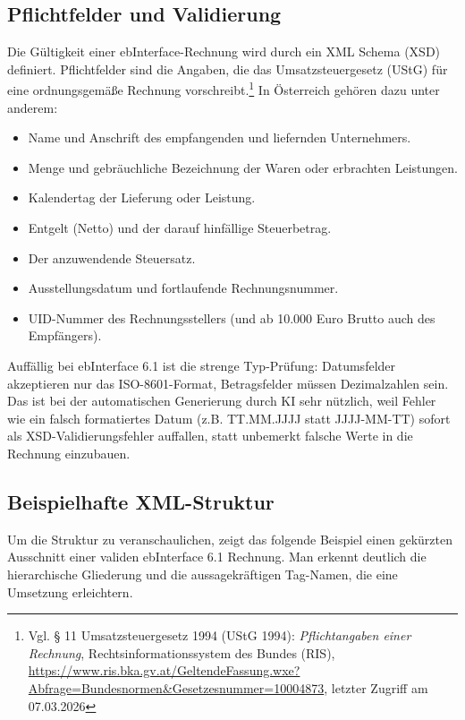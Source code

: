 \subsection{Pflichtfelder und Validierung}
Die Gültigkeit einer ebInterface-Rechnung wird durch ein XML Schema (XSD) definiert. Pflichtfelder sind die Angaben, die das Umsatzsteuergesetz (UStG) für eine ordnungsgemäße Rechnung vorschreibt.\footnote{Vgl. § 11 Umsatzsteuergesetz 1994 (UStG 1994): \textit{Pflichtangaben einer Rechnung}, Rechtsinformationssystem des Bundes (RIS), \url{https://www.ris.bka.gv.at/GeltendeFassung.wxe?Abfrage=Bundesnormen&Gesetzesnummer=10004873}, letzter Zugriff am 07.03.2026} In Österreich gehören dazu unter anderem:
\begin{itemize}
    \item Name und Anschrift des empfangenden und liefernden Unternehmers.
    \item Menge und gebräuchliche Bezeichnung der Waren oder erbrachten Leistungen.
    \item Kalendertag der Lieferung oder Leistung.
    \item Entgelt (Netto) und der darauf hinfällige Steuerbetrag.
    \item Der anzuwendende Steuersatz.
    \item Ausstellungsdatum und fortlaufende Rechnungsnummer.
    \item UID-Nummer des Rechnungsstellers (und ab 10.000 Euro Brutto auch des Empfängers).
\end{itemize}

Auffällig bei ebInterface 6.1 ist die strenge Typ-Prüfung: Datumsfelder akzeptieren nur das ISO-8601-Format, Betragsfelder müssen Dezimalzahlen sein. Das ist bei der automatischen Generierung durch KI sehr nützlich, weil Fehler wie ein falsch formatiertes Datum (z.B. TT.MM.JJJJ statt JJJJ-MM-TT) sofort als XSD-Validierungsfehler auffallen, statt unbemerkt falsche Werte in die Rechnung einzubauen.

\subsection{Beispielhafte XML-Struktur}
Um die Struktur zu veranschaulichen, zeigt das folgende Beispiel einen gekürzten Ausschnitt einer validen ebInterface 6.1 Rechnung. Man erkennt deutlich die hierarchische Gliederung und die aussagekräftigen Tag-Namen, die eine Umsetzung erleichtern.

